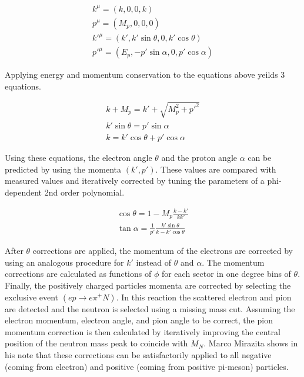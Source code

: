 \begin{gather}
	k^{\mu} = (k, 0, 0, k)                         \\
	p^{\mu} = (M_{p}, 0, 0, 0)                     \\
	k'^{\mu} = (k', k'\sin\theta, 0, k'\cos\theta) \\
	p'^{\mu} = (E_{p}, -p'\sin\alpha, 0, p'\cos\alpha) 
\end{gather}

Applying energy and momentum conservation to the equations above yeilds 3 equations.

\begin{gather}
	k + M_p = k' + \sqrt{M_{p}^{2} + p'^2} \\
	k'\sin\theta = p'\sin\alpha            \\
	k = k'\cos\theta + p'\cos\alpha  
\end{gather}

Using these equations, the electron angle $\theta$ and the proton angle $\alpha$ can be predicted by using the momenta $(k',p')$.  These values are compared with measured values and iteratively corrected by tuning the parameters of a phi-dependent 2nd order polynomial.

\begin{gather}
	\cos\theta = 1 - M_p \frac{k-k'}{kk'} \\
	\tan\alpha = \frac{1}{p'} \frac{k'\sin\theta}{k-k'\cos\theta}
\end{gather}

After $\theta$ corrections are applied, the momentum of the electrons are corrected by using an analogous procedure for $k'$ instead of $\theta$ and $\alpha$.  The momentum corrections are calculated as functions of $\phi$ for each sector in one degree bins of $\theta$.  Finally, the positively charged particles momenta are corrected by selecting the exclusive event $(ep \rightarrow e\pi^+N)$.  In this reaction the scattered electron and pion are detected and the neutron is selected using a missing mass cut.  Assuming the electron momentum, electron angle, and pion angle to be correct, the pion momentum correction is then calculated by iteratively improving the central position of the neutron mass peak to coincide with $M_{N}$.  Marco Mirazita shows in his note that these corrections can be satisfactorily applied to all negative (coming from electron) and positive (coming from positive pi-meson) particles.    

